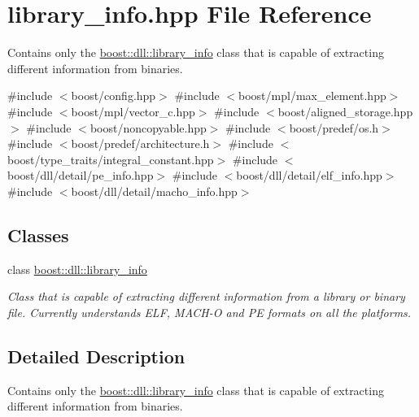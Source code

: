 \hypertarget{a00263}{}\section{library\+\_\+info.\+hpp File Reference}
\label{a00263}


Contains only the \hyperlink{a01704}{boost\+::dll\+::library\+\_\+info} class that is capable of extracting different information from binaries.  


{\ttfamily \#include $<$boost/config.\+hpp$>$}\newline
{\ttfamily \#include $<$boost/mpl/max\+\_\+element.\+hpp$>$}\newline
{\ttfamily \#include $<$boost/mpl/vector\+\_\+c.\+hpp$>$}\newline
{\ttfamily \#include $<$boost/aligned\+\_\+storage.\+hpp$>$}\newline
{\ttfamily \#include $<$boost/noncopyable.\+hpp$>$}\newline
{\ttfamily \#include $<$boost/predef/os.\+h$>$}\newline
{\ttfamily \#include $<$boost/predef/architecture.\+h$>$}\newline
{\ttfamily \#include $<$boost/type\+\_\+traits/integral\+\_\+constant.\+hpp$>$}\newline
{\ttfamily \#include $<$boost/dll/detail/pe\+\_\+info.\+hpp$>$}\newline
{\ttfamily \#include $<$boost/dll/detail/elf\+\_\+info.\+hpp$>$}\newline
{\ttfamily \#include $<$boost/dll/detail/macho\+\_\+info.\+hpp$>$}\newline
\subsection*{Classes}
\begin{DoxyCompactItemize}
\item 
class \hyperlink{a01704}{boost\+::dll\+::library\+\_\+info}
\begin{DoxyCompactList}\small\item\em Class that is capable of extracting different information from a library or binary file. Currently understands E\+LF, M\+A\+C\+H-\/O and PE formats on all the platforms. \end{DoxyCompactList}\end{DoxyCompactItemize}


\subsection{Detailed Description}
Contains only the \hyperlink{a01704}{boost\+::dll\+::library\+\_\+info} class that is capable of extracting different information from binaries. 

